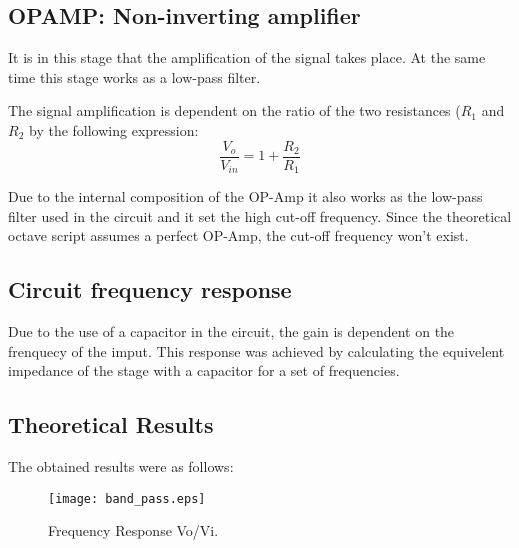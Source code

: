 \subsection{OPAMP: Non-inverting amplifier}
\label{subsec:envdet}

It is in this stage that the amplification of the signal takes place. At the same time this stage works as a low-pass filter.

The signal amplification is dependent on the ratio of the two resistances (\(R_1\) and \(R_2\) by the following expression:
\[
\frac{V_o}{V_{in}} = 1 + \frac{R_2}{R_1}
\]

Due to the internal composition of the OP-Amp it also works as the low-pass filter used in the circuit and it set the high cut-off frequency. Since the theoretical octave script assumes a perfect OP-Amp, the cut-off frequency won't exist.


\subsection {Circuit frequency response}
Due to the use of a capacitor in the circuit, the gain is dependent on the frenquecy of the imput. This response was achieved by calculating the equivelent impedance of the stage with a capacitor for a set of frequencies.



\subsection{Theoretical Results}
\label{subsec:res_the}

The obtained results were as follows:
\begin{figure}[ht]
	\centering
	\texttt{[image: band\_pass.eps]}
	\caption{Frequency Response Vo/Vi.}
\label{fig:oct}
\end{figure}

%   		
%	
%   

%   		
%	


